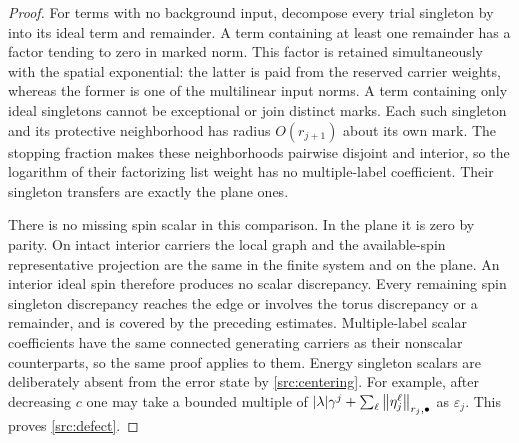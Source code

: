 \begin{proof}
For terms with no background input, decompose every trial singleton by
 into its ideal term and remainder. A term containing at
least one remainder has a factor tending to zero in marked norm. This
factor is retained simultaneously with the spatial exponential: the
latter is paid from the reserved carrier weights, whereas the former is
one of the multilinear input norms. A term containing only ideal
singletons cannot be exceptional or join distinct marks. Each such
singleton and its protective neighborhood has radius $O(r_{j+1})$
about its own mark. The stopping fraction makes these neighborhoods
pairwise disjoint and interior, so the logarithm of their factorizing
list weight has no multiple-label coefficient. Their singleton
transfers are exactly the plane ones.

There is no missing spin scalar in this comparison. In the plane it is
zero by parity. On intact interior carriers the local graph and the
available-spin representative projection are the same in the finite
system and on the plane. An interior ideal spin therefore produces no
scalar discrepancy. Every remaining spin singleton discrepancy reaches
the edge or involves the torus discrepancy or a remainder, and is
covered by the preceding estimates. Multiple-label scalar coefficients
have the same connected generating carriers as their nonscalar
counterparts, so the same proof applies to them. Energy singleton
scalars are deliberately absent from the error state by
\eqref{src:centering}. For example, after decreasing $c$ one may take a
bounded multiple of
$|\lambda|\gamma^j+\sum_\ell\left\|\eta_j^\ell\right\|_{r_j,\bullet}$
as $\varepsilon_j$. This proves \eqref{src:defect}.


\end{proof}
